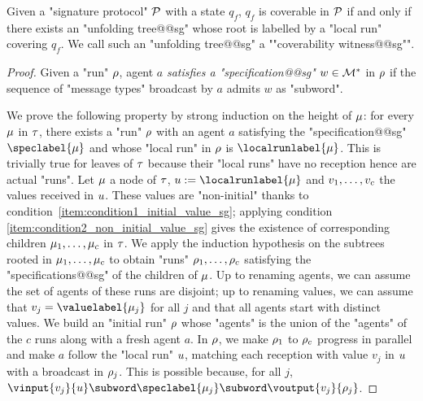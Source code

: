 \begin{lemma}
\label{lem:coverability_witness_sg}
Given a "signature protocol" $\mathcal{P}$ with a state $q_f$, $q_f$ is coverable in $\mathcal{P}$ if and only if there exists an "unfolding tree@@sg" whose root is labelled by a "local run" covering $q_f$. We call such an "unfolding tree@@sg" a ""coverability witness@@sg"".
\end{lemma}
\begin{proof}
Given a "run" $\rho$, agent $a$ \emph{satisfies a "specification@@sg"} $w \in \mathcal{M}^*$ in $\rho$ if the sequence of "message types" broadcast by $a$ admits $w$ as "subword".%

We prove the following property by strong induction on the height of $\mu$: for every $\mu$ in $\tau$, there exists a "run" $\rho$ with an agent $a$ satisfying the "specification@@sg" $\speclabel{\node}$ and whose "local run" in $\rho$ is $\localrunlabel{\node}$. This is trivially true for leaves of $\tau$ because their "local runs" have no reception hence are actual "runs". 
Let $\mu$ a node of $\tau$, $\localrun := \localrunlabel{\node}$ and $v_1, \dots, v_c$ the values received in $u$. 
These values are "non-initial" thanks to condition~\ref{item:condition1_initial_value_sg}; applying condition \ref{item:condition2_non_initial_value_sg} gives the existence of corresponding children $\mu_1, \dots, \mu_c$ in $\tau$. 
We apply the induction hypothesis on the subtrees rooted in $\mu_1, \dots, \mu_c$ to obtain "runs" $\rho_1, \dots, \rho_c$ satisfying the "specifications@@sg" of the children of $\mu$. 
Up to renaming agents, we can assume the set of agents of these runs are disjoint; up to renaming values, we can assume that $\aval_j = \valuelabel{\node_j}$ for all $j$ and that all agents start with distinct values. 
We build an "initial run" $\rho$ whose "agents" is the union of the "agents" of the $c$ runs along with a fresh agent $a$. In $\rho$, we make $\rho_1$ to $\rho_c$ progress in parallel and make $a$ follow the "local run" $u$, matching each reception with value $v_j$ in $u$ with a broadcast in $\rho_j$. 
This is possible because, for all $j$, $\vinput{v_j}{\localrun} \subword \speclabel{\node_j} \subword \voutput{v_j}{\run_j}$. 


\end{proof}
